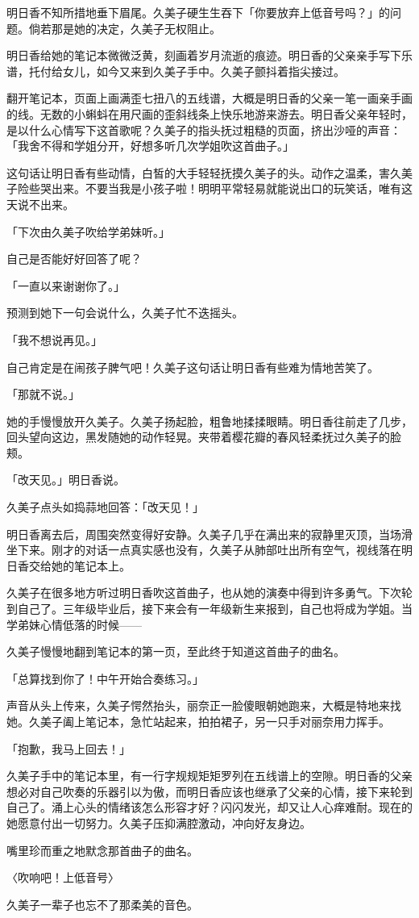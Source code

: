 \documentclass[UTF8]{ctexart}
\begin{document}
    明日香不知所措地垂下眉尾。久美子硬生生吞下「你要放弃上低音号吗？」的问题。倘若那是她的决定，久美子无权阻止。 

    明日香给她的笔记本微微泛黄，刻画着岁月流逝的痕迹。明日香的父亲亲手写下乐谱，托付给女儿，如今又来到久美子手中。久美子颤抖着指尖接过。 

    翻开笔记本，页面上画满歪七扭八的五线谱，大概是明日香的父亲一笔一画亲手画的线。无数的小蝌蚪在用尺画的歪斜线条上快乐地游来游去。明日香父亲年轻时，是以什么心情写下这首歌呢？久美子的指头抚过粗糙的页面，挤出沙哑的声音：「我舍不得和学姐分开，好想多听几次学姐吹这首曲子。」 

    这句话让明日香有些动情，白皙的大手轻轻抚摸久美子的头。动作之温柔，害久美子险些哭出来。不要当我是小孩子啦！明明平常轻易就能说出口的玩笑话，唯有这天说不出来。 

    「下次由久美子吹给学弟妹听。」 

    自己是否能好好回答了呢？ 

    「一直以来谢谢你了。」 

    预测到她下一句会说什么，久美子忙不迭摇头。 

    「我不想说再见。」 

    自己肯定是在闹孩子脾气吧！久美子这句话让明日香有些难为情地苦笑了。 

    「那就不说。」 

    她的手慢慢放开久美子。久美子扬起脸，粗鲁地揉揉眼睛。明日香往前走了几步，回头望向这边，黑发随她的动作轻晃。夹带着樱花瓣的春风轻柔抚过久美子的脸颊。 

    「改天见。」明日香说。 

    久美子点头如捣蒜地回答：「改天见！」 

    明日香离去后，周围突然变得好安静。久美子几乎在满出来的寂静里灭顶，当场滑坐下来。刚才的对话一点真实感也没有，久美子从肺部吐出所有空气，视线落在明日香交给她的笔记本上。 

    久美子在很多地方听过明日香吹这首曲子，也从她的演奏中得到许多勇气。下次轮到自己了。三年级毕业后，接下来会有一年级新生来报到，自己也将成为学姐。当学弟妹心情低落的时候—— 

    久美子慢慢地翻到笔记本的第一页，至此终于知道这首曲子的曲名。 

    「总算找到你了！中午开始合奏练习。」 

    声音从头上传来，久美子愕然抬头，丽奈正一脸傻眼朝她跑来，大概是特地来找她。久美子阖上笔记本，急忙站起来，拍拍裙子，另一只手对丽奈用力挥手。 

    「抱歉，我马上回去！」 

    久美子手中的笔记本里，有一行字规规矩矩罗列在五线谱上的空隙。明日香的父亲想必对自己吹奏的乐器引以为傲，而明日香应该也继承了父亲的心情，接下来轮到自己了。涌上心头的情绪该怎么形容才好？闪闪发光，却又让人心痒难耐。现在的她愿意付出一切努力。久美子压抑满腔激动，冲向好友身边。 

    嘴里珍而重之地默念那首曲子的曲名。 

    〈吹响吧！上低音号〉 

    久美子一辈子也忘不了那柔美的音色。   
\end{document}
